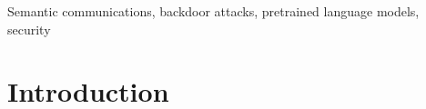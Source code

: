 \documentclass[journal]{IEEEtran}
\begin{document}
\begin{IEEEkeywords}
Semantic communications, backdoor attacks, pretrained language models, security
\end{IEEEkeywords}

\section{Introduction} 

\end{document}

